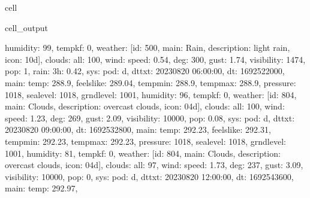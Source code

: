 \documentclass[letterpaper,10pt,english]{jupyterBook}
\begin{document}
\begin{sphinxuseclass}{cell}
\begin{sphinxVerbatimOutput}
\begin{sphinxuseclass}{cell_output}
\begin{sphinxVerbatim}[commandchars=\\\{\}]
\PYGZsq{}humidity\PYGZsq{}: 99, \PYGZsq{}temp\PYGZus{}kf\PYGZsq{}: 0\PYGZcb{}, \PYGZsq{}weather\PYGZsq{}: [\PYGZob{}\PYGZsq{}id\PYGZsq{}: 500, \PYGZsq{}main\PYGZsq{}: \PYGZsq{}Rain\PYGZsq{}, \PYGZsq{}description\PYGZsq{}: \PYGZsq{}light rain\PYGZsq{}, \PYGZsq{}icon\PYGZsq{}: \PYGZsq{}10d\PYGZsq{}\PYGZcb{}], \PYGZsq{}clouds\PYGZsq{}: \PYGZob{}\PYGZsq{}all\PYGZsq{}: 100\PYGZcb{}, \PYGZsq{}wind\PYGZsq{}: \PYGZob{}\PYGZsq{}speed\PYGZsq{}: 0.54, \PYGZsq{}deg\PYGZsq{}: 300, \PYGZsq{}gust\PYGZsq{}: 1.74\PYGZcb{}, \PYGZsq{}visibility\PYGZsq{}: 1474, \PYGZsq{}pop\PYGZsq{}: 1, \PYGZsq{}rain\PYGZsq{}: \PYGZob{}\PYGZsq{}3h\PYGZsq{}: 0.42\PYGZcb{}, \PYGZsq{}sys\PYGZsq{}: \PYGZob{}\PYGZsq{}pod\PYGZsq{}: \PYGZsq{}d\PYGZsq{}\PYGZcb{}, \PYGZsq{}dt\PYGZus{}txt\PYGZsq{}: \PYGZsq{}2023\PYGZhy{}08\PYGZhy{}20 06:00:00\PYGZsq{}\PYGZcb{}, \PYGZob{}\PYGZsq{}dt\PYGZsq{}: 1692522000, \PYGZsq{}main\PYGZsq{}: \PYGZob{}\PYGZsq{}temp\PYGZsq{}: 288.9, \PYGZsq{}feels\PYGZus{}like\PYGZsq{}: 289.04, \PYGZsq{}temp\PYGZus{}min\PYGZsq{}: 288.9, \PYGZsq{}temp\PYGZus{}max\PYGZsq{}: 288.9, \PYGZsq{}pressure\PYGZsq{}: 1018, \PYGZsq{}sea\PYGZus{}level\PYGZsq{}: 1018, \PYGZsq{}grnd\PYGZus{}level\PYGZsq{}: 1001, \PYGZsq{}humidity\PYGZsq{}: 96, \PYGZsq{}temp\PYGZus{}kf\PYGZsq{}: 0\PYGZcb{}, \PYGZsq{}weather\PYGZsq{}: [\PYGZob{}\PYGZsq{}id\PYGZsq{}: 804, \PYGZsq{}main\PYGZsq{}: \PYGZsq{}Clouds\PYGZsq{}, \PYGZsq{}description\PYGZsq{}: \PYGZsq{}overcast clouds\PYGZsq{}, \PYGZsq{}icon\PYGZsq{}: \PYGZsq{}04d\PYGZsq{}\PYGZcb{}], \PYGZsq{}clouds\PYGZsq{}: \PYGZob{}\PYGZsq{}all\PYGZsq{}: 100\PYGZcb{}, \PYGZsq{}wind\PYGZsq{}: \PYGZob{}\PYGZsq{}speed\PYGZsq{}: 1.23, \PYGZsq{}deg\PYGZsq{}: 269, \PYGZsq{}gust\PYGZsq{}: 2.09\PYGZcb{}, \PYGZsq{}visibility\PYGZsq{}: 10000, \PYGZsq{}pop\PYGZsq{}: 0.08, \PYGZsq{}sys\PYGZsq{}: \PYGZob{}\PYGZsq{}pod\PYGZsq{}: \PYGZsq{}d\PYGZsq{}\PYGZcb{}, \PYGZsq{}dt\PYGZus{}txt\PYGZsq{}: \PYGZsq{}2023\PYGZhy{}08\PYGZhy{}20 09:00:00\PYGZsq{}\PYGZcb{}, \PYGZob{}\PYGZsq{}dt\PYGZsq{}: 1692532800, \PYGZsq{}main\PYGZsq{}: \PYGZob{}\PYGZsq{}temp\PYGZsq{}: 292.23, \PYGZsq{}feels\PYGZus{}like\PYGZsq{}: 292.31, \PYGZsq{}temp\PYGZus{}min\PYGZsq{}: 292.23, \PYGZsq{}temp\PYGZus{}max\PYGZsq{}: 292.23, \PYGZsq{}pressure\PYGZsq{}: 1018, \PYGZsq{}sea\PYGZus{}level\PYGZsq{}: 1018, \PYGZsq{}grnd\PYGZus{}level\PYGZsq{}: 1001, \PYGZsq{}humidity\PYGZsq{}: 81, \PYGZsq{}temp\PYGZus{}kf\PYGZsq{}: 0\PYGZcb{}, \PYGZsq{}weather\PYGZsq{}: [\PYGZob{}\PYGZsq{}id\PYGZsq{}: 804, \PYGZsq{}main\PYGZsq{}: \PYGZsq{}Clouds\PYGZsq{}, \PYGZsq{}description\PYGZsq{}: \PYGZsq{}overcast clouds\PYGZsq{}, \PYGZsq{}icon\PYGZsq{}: \PYGZsq{}04d\PYGZsq{}\PYGZcb{}], \PYGZsq{}clouds\PYGZsq{}: \PYGZob{}\PYGZsq{}all\PYGZsq{}: 97\PYGZcb{}, \PYGZsq{}wind\PYGZsq{}: \PYGZob{}\PYGZsq{}speed\PYGZsq{}: 1.73, \PYGZsq{}deg\PYGZsq{}: 237, \PYGZsq{}gust\PYGZsq{}: 3.09\PYGZcb{}, \PYGZsq{}visibility\PYGZsq{}: 10000, \PYGZsq{}pop\PYGZsq{}: 0, \PYGZsq{}sys\PYGZsq{}: \PYGZob{}\PYGZsq{}pod\PYGZsq{}: \PYGZsq{}d\PYGZsq{}\PYGZcb{}, \PYGZsq{}dt\PYGZus{}txt\PYGZsq{}: \PYGZsq{}2023\PYGZhy{}08\PYGZhy{}20 12:00:00\PYGZsq{}\PYGZcb{}, \PYGZob{}\PYGZsq{}dt\PYGZsq{}: 1692543600, \PYGZsq{}main\PYGZsq{}: \PYGZob{}\PYGZsq{}temp\PYGZsq{}: 292.97, 
\end{sphinxVerbatim}
\end{sphinxuseclass}
\end{sphinxVerbatimOutput}
\end{sphinxuseclass}
\end{document}
